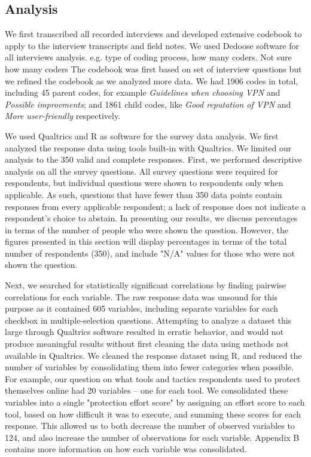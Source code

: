\subsection{Analysis} We first transcribed all recorded interviews and
developed extensive codebook to apply to the interview transcripts and field notes. We used Dedoose software for all interviews analysis.   e.g. type of coding process, how many coders. Not sure how many coders
The codebook was first based on set of interview questions but we refined the codebook as we analyzed more data. We had 1906 codes in total, including 45 parent codes,
for example \textit{Guidelines when choosing VPN} and \textit{Possible improvments}; and 1861 child codes, like \textit{Good reputation of VPN} and \textit{More user-friendly} respectively.

We used Qualtrics and R as software for the survey data analysis. We first analyzed the
response data using tools built-in with Qualtrics. We limited our analysis to
the 350 valid and complete responses. First, we performed descriptive analysis on all the survey questions. All survey questions were required for respondents, but individual questions
were shown to respondents only when applicable. As such, questions that have
fewer than 350 data points contain responses from every applicable respondent;
a lack of response does not indicate a respondent's choice to abstain. In
presenting our results, we discuss percentages in terms of the number of
people who were shown the question. However, the figures presented in this
section will display percentages in terms of the total number of respondents
(350), and include "N/A" values for those who were not shown the question.

Next, we searched for statistically
significant correlations by finding pairwise correlations for each variable.
The raw response data was unsound for this purpose as it contained 605
variables, including separate variables for each checkbox in
multiple-selection questions. Attempting to analyze a dataset this large
through Qualtrics software resulted in erratic behavior, and would not produce
meaningful results without first cleaning the data using methods not available
in Qualtrics. We cleaned the response dataset using R, and reduced the number
of variables by consolidating them into fewer categories when possible. For
example, our question on what tools and tactics respondents used to protect
themselves online had 20 variables -- one for each tool. We consolidated these
variables into a single "protection effort score" by assigning an effort score
to each tool, based on how difficult it was to execute, and summing these
scores for each response. This allowed us to both decrease the number of
observed variables to 124, and also increase the number of observations for
each variable. Appendix B contains more information on how each variable was
consolidated. 

